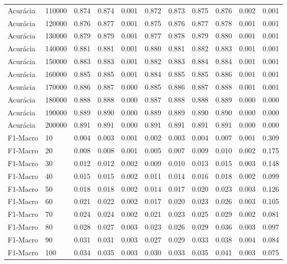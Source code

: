 \begin{table}[htbp]
\begin{table}
\begin{tabular}{ll|rrrrrrr|rr}
Acurácia & 110000 & 0.874 & 0.874 & 0.001 & 0.872 & 0.873 & 0.875 & 0.876 & 0.002 & 0.001 \\
Acurácia & 120000 & 0.876 & 0.877 & 0.001 & 0.875 & 0.876 & 0.877 & 0.878 & 0.001 & 0.001 \\
Acurácia & 130000 & 0.879 & 0.879 & 0.001 & 0.877 & 0.878 & 0.879 & 0.880 & 0.001 & 0.001 \\
Acurácia & 140000 & 0.881 & 0.881 & 0.001 & 0.880 & 0.881 & 0.882 & 0.883 & 0.001 & 0.001 \\
Acurácia & 150000 & 0.883 & 0.883 & 0.001 & 0.882 & 0.883 & 0.884 & 0.884 & 0.001 & 0.001 \\
Acurácia & 160000 & 0.885 & 0.885 & 0.001 & 0.884 & 0.885 & 0.885 & 0.886 & 0.001 & 0.001 \\
Acurácia & 170000 & 0.886 & 0.887 & 0.000 & 0.885 & 0.886 & 0.887 & 0.888 & 0.001 & 0.001 \\
Acurácia & 180000 & 0.888 & 0.888 & 0.000 & 0.887 & 0.888 & 0.888 & 0.889 & 0.000 & 0.000 \\
Acurácia & 190000 & 0.889 & 0.890 & 0.000 & 0.889 & 0.889 & 0.890 & 0.890 & 0.000 & 0.000 \\
Acurácia & 200000 & 0.891 & 0.891 & 0.000 & 0.891 & 0.891 & 0.891 & 0.891 & 0.000 & 0.000 \\
F1-Macro & 10 & 0.004 & 0.003 & 0.001 & 0.002 & 0.003 & 0.004 & 0.007 & 0.001 & 0.309 \\
F1-Macro & 20 & 0.008 & 0.008 & 0.001 & 0.005 & 0.007 & 0.009 & 0.010 & 0.002 & 0.175 \\
F1-Macro & 30 & 0.012 & 0.012 & 0.002 & 0.009 & 0.010 & 0.013 & 0.015 & 0.003 & 0.148 \\
F1-Macro & 40 & 0.015 & 0.015 & 0.002 & 0.011 & 0.014 & 0.016 & 0.018 & 0.002 & 0.099 \\
F1-Macro & 50 & 0.018 & 0.018 & 0.002 & 0.014 & 0.017 & 0.020 & 0.023 & 0.003 & 0.126 \\
F1-Macro & 60 & 0.021 & 0.022 & 0.002 & 0.017 & 0.020 & 0.023 & 0.026 & 0.003 & 0.105 \\
F1-Macro & 70 & 0.024 & 0.024 & 0.002 & 0.021 & 0.023 & 0.025 & 0.029 & 0.002 & 0.081 \\
F1-Macro & 80 & 0.028 & 0.027 & 0.003 & 0.023 & 0.026 & 0.029 & 0.036 & 0.003 & 0.097 \\
F1-Macro & 90 & 0.031 & 0.031 & 0.003 & 0.027 & 0.029 & 0.033 & 0.038 & 0.004 & 0.084 \\
F1-Macro & 100 & 0.034 & 0.035 & 0.003 & 0.030 & 0.033 & 0.035 & 0.041 & 0.003 & 0.075 \\

\end{tabular}
\end{table}
\end{table}
